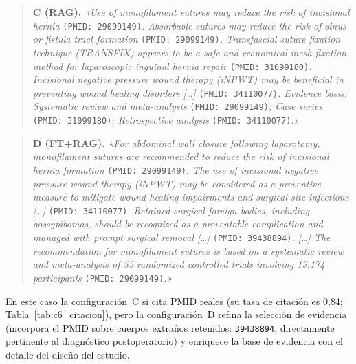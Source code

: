 \documentclass[11pt,a4paper,spanish]{book}
\numberwithin{equation}{chapter}
\numberwithin{figure}{chapter}
\begin{document}
\begin{quote}\small
\textbf{C (RAG).} \emph{«Use of monofilament sutures may reduce the risk of incisional hernia} \texttt{(PMID: 29099149)}\emph{. Absorbable sutures may reduce the risk of sinus or fistula tract formation} \texttt{(PMID: 29099149)}\emph{. Transfascial suture fixation technique (TRANSFIX) appears to be a safe and economical mesh fixation method for laparoscopic inguinal hernia repair} \texttt{(PMID: 31099180)}\emph{. Incisional negative pressure wound therapy (iNPWT) may be beneficial in preventing wound healing disorders [\ldots]} \texttt{(PMID: 34110077)}\emph{. Evidence basis: Systematic review and meta-analysis} \texttt{(PMID: 29099149)}\emph{; Case series} \texttt{(PMID: 31099180)}\emph{; Retrospective analysis} \texttt{(PMID: 34110077)}\emph{.»}
\end{quote}

\begin{quote}\small
\textbf{D (FT+RAG).} \emph{«For abdominal wall closure following laparotomy, monofilament sutures are recommended to reduce the risk of incisional hernia formation} \texttt{(PMID: 29099149)}\emph{. The use of incisional negative pressure wound therapy (iNPWT) may be considered as a preventive measure to mitigate wound healing impairments and surgical site infections [\ldots]} \texttt{(PMID: 34110077)}\emph{. Retained surgical foreign bodies, including gossypibomas, should be recognized as a preventable complication and managed with prompt surgical removal [\ldots]} \texttt{(PMID: 39438894)}\emph{. [\ldots] The recommendation for monofilament sutures is based on a systematic review and meta-analysis of 55 randomized controlled trials involving 19,174 participants} \texttt{(PMID: 29099149)}\emph{.»}
\end{quote}

En este caso la configuración~C sí cita PMID reales (su tasa de citación es 0{,}84; Tabla~\ref{tab:c6_citacion}), pero la configuración~D refina la selección de evidencia (incorpora el PMID sobre cuerpos extraños retenidos: \texttt{39438894}, directamente pertinente al diagnóstico postoperatorio) y enriquece la base de evidencia con el detalle del diseño del estudio.
\end{document}
